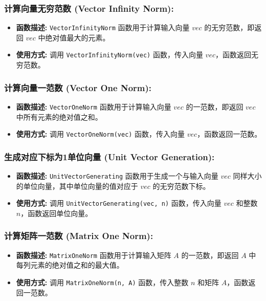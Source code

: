 \documentclass{article}
\begin{document}
\subsubsection*{计算向量无穷范数 (Vector Infinity Norm):}
\begin{itemize}
	\item \textbf{函数描述:} \texttt{VectorInfinityNorm} 函数用于计算输入向量 $vec$ 的无穷范数，即返回 $vec$ 中绝对值最大的元素。
	\item \textbf{使用方式:} 调用 \texttt{VectorInfinityNorm(vec)} 函数，传入向量 $vec$，函数返回无穷范数。
\end{itemize}

\subsubsection*{计算向量一范数 (Vector One Norm):}
\begin{itemize}
	\item \textbf{函数描述:} \texttt{VectorOneNorm} 函数用于计算输入向量 $vec$ 的一范数，即返回 $vec$ 中所有元素的绝对值之和。
	\item \textbf{使用方式:} 调用 \texttt{VectorOneNorm(vec)} 函数，传入向量 $vec$，函数返回一范数。
\end{itemize}

\subsubsection*{生成对应下标为1单位向量 (Unit Vector Generation):}
\begin{itemize}
	\item \textbf{函数描述:} \texttt{UnitVectorGenerating} 函数用于生成一个与输入向量 $vec$ 同样大小的单位向量，其中单位向量的值对应于 $vec$ 的无穷范数下标。
	\item \textbf{使用方式:} 调用 \texttt{UnitVectorGenerating(vec, n)} 函数，传入向量 $vec$ 和整数 $n$，函数返回单位向量。
\end{itemize}

\subsubsection*{计算矩阵一范数 (Matrix One Norm):}
\begin{itemize}
	\item \textbf{函数描述:} \texttt{MatrixOneNorm} 函数用于计算输入矩阵 $A$ 的一范数，即返回 $A$ 中每列元素的绝对值之和的最大值。
	\item \textbf{使用方式:} 调用 \texttt{MatrixOneNorm(n, A)} 函数，传入整数 $n$ 和矩阵 $A$，函数返回一范数。
\end{itemize}
\end{document}
